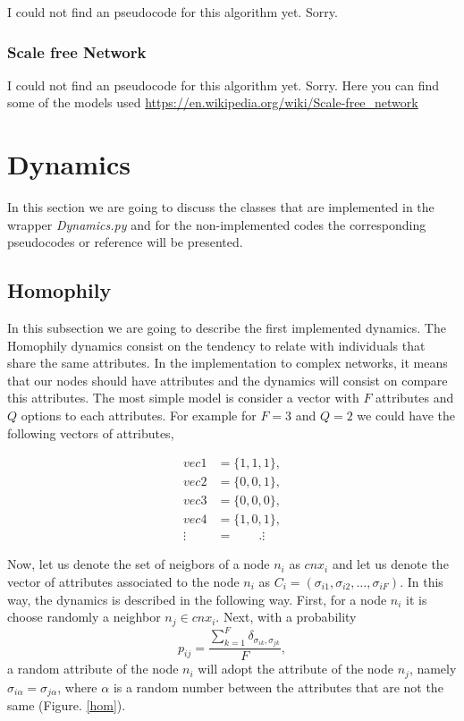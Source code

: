 \documentclass{article}
\begin{document}
I could not find an pseudocode for this algorithm yet. Sorry. 

\subsubsection{Scale free Network}

I could not find an pseudocode for this algorithm yet. Sorry. Here you can find some of the models used \url{https://en.wikipedia.org/wiki/Scale-free_network}

\section{Dynamics}

In this section we are going to discuss the classes that are implemented in the wrapper \textit{Dynamics.py} and for the non-implemented codes the corresponding pseudocodes or reference will be presented. 

\subsection{Homophily}

In this subsection we are going to describe the first implemented dynamics. The Homophily dynamics consist on the tendency to relate with individuals that share the same attributes. In the implementation to complex networks, it means that our nodes should have attributes and the dynamics will consist on compare this attributes. The most simple model is consider a vector with $F$ attributes and $Q$ options to each attributes. For example for $F=3$  and $Q=2$ we could have the following vectors of attributes,

\begin{align*}
    vec1 &= \{1, 1,1 \}, \\
    vec2 &= \{0, 0,1 \}, \\
    vec3 &= \{0, 0,0 \},\\
    vec4 &= \{1, 0,1 \}, \\
    \vdots \quad &= \qquad.  \vdots
\end{align*}

Now, let us denote the set of neigbors of a node $n_i$ as $cnx_i$ and let us denote the vector of attributes associated to the node $n_i$ as $C_i = \left(\sigma_{i1},\sigma_{i2}, \dots , \sigma_{iF}  \right)$. In this way, the dynamics is described in the following way. First, for a node $n_i$ it is choose randomly a neighbor $n_j \in cnx_i$. Next, with a probability $$ p_{ij} = \frac{\sum_{k = 1}^{F}  \delta_{\sigma_{ik}, \sigma_{jk}}}{F}, $$
a random attribute of the node $n_i$ will adopt the attribute of the node $n_j$, namely $\sigma_{i \alpha} = \sigma_{j \alpha}$, where $\alpha$ is a random number between the attributes that are not the same (Figure. \ref{hom}).
\end{document}
